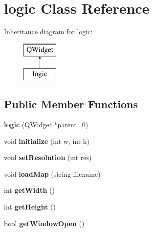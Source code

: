 \hypertarget{classlogic}{}\section{logic Class Reference}
\label{classlogic}
Inheritance diagram for logic\+:\begin{figure}[H]
\begin{center}
\leavevmode
\includegraphics[height=2.000000cm]{classlogic}
\end{center}
\end{figure}
\subsection*{Public Member Functions}
\begin{DoxyCompactItemize}
\item 
\hypertarget{classlogic_afeb64b81f69e6d1f66421d9e49fab832}{}\label{classlogic_afeb64b81f69e6d1f66421d9e49fab832} 
{\bfseries logic} (Q\+Widget $\ast$parent=0)
\item 
\hypertarget{classlogic_af867500c17777425154268768a9eb463}{}\label{classlogic_af867500c17777425154268768a9eb463} 
void {\bfseries initialize} (int w, int h)
\item 
\hypertarget{classlogic_a30e87e24b2850a02828f9c11291eb001}{}\label{classlogic_a30e87e24b2850a02828f9c11291eb001} 
void {\bfseries set\+Resolution} (int res)
\item 
\hypertarget{classlogic_ad3a599ff9c7f5a3e84379f0a121010fc}{}\label{classlogic_ad3a599ff9c7f5a3e84379f0a121010fc} 
void {\bfseries load\+Map} (string filename)
\item 
\hypertarget{classlogic_a28ab425885566a86b0700fdeeacc9255}{}\label{classlogic_a28ab425885566a86b0700fdeeacc9255} 
int {\bfseries get\+Width} ()
\item 
\hypertarget{classlogic_afc7a47dc48d48f258e8b5a1ce36b1d7f}{}\label{classlogic_afc7a47dc48d48f258e8b5a1ce36b1d7f} 
int {\bfseries get\+Height} ()
\item 
\hypertarget{classlogic_a01b2dc69b06a0de6483c5321fc5cd49d}{}\label{classlogic_a01b2dc69b06a0de6483c5321fc5cd49d} 
bool {\bfseries get\+Window\+Open} ()
\end{DoxyCompactItemize}
